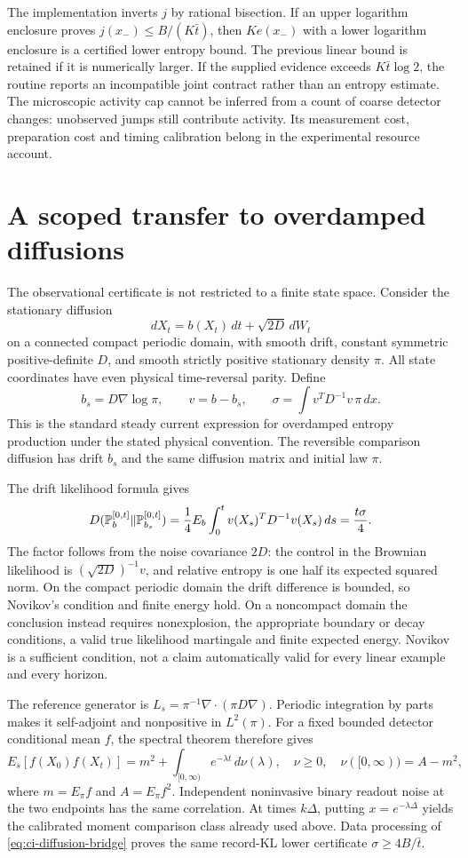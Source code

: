 The implementation inverts $j$ by rational bisection. If an upper logarithm
enclosure proves $j(x_-)\le B/(K\bar t)$, then
$Ke(x_-)$ with a lower logarithm enclosure is a certified lower entropy
bound. The previous linear bound is retained if it is numerically larger.
If the supplied evidence exceeds $K\bar t\log2$, the routine reports an
incompatible joint contract rather than an entropy estimate. The microscopic
activity cap cannot be inferred from a count of coarse detector changes:
unobserved jumps still contribute activity. Its measurement cost, preparation
cost and timing calibration belong in the experimental resource account.

\section{A scoped transfer to overdamped diffusions}
The observational certificate is not restricted to a finite state space.
Consider the stationary diffusion
\[
 dX_t=b(X_t)\,dt+\sqrt{2D}\,dW_t
\]
on a connected compact periodic domain, with smooth drift, constant symmetric
positive-definite $D$, and smooth strictly positive stationary density $\pi$.
All state coordinates have even physical time-reversal parity. Define
\[
 b_s=D\nabla\log\pi,\qquad v=b-b_s,\qquad
 \sigma=\int v^TD^{-1}v\,\pi\,dx.
\]
This is the standard steady current expression for overdamped entropy
production under the stated physical convention\cite{ciSeifert2012}.
The reversible comparison diffusion has drift $b_s$ and the same diffusion
matrix and initial law $\pi$.

The drift likelihood formula\cite{ciGirsanov1960} gives
\begin{equation}
 D(\mathbb P_b^{[0,t]}\Vert\mathbb P_{b_s}^{[0,t]})
   ={1\over4}E_b\int_0^t v(X_s)^TD^{-1}v(X_s)\,ds
   ={t\sigma\over4}.
 \label{eq:ci-diffusion-bridge}
\end{equation}
The factor follows from the noise covariance $2D$: the control in the
Brownian likelihood is $(\sqrt{2D})^{-1}v$, and relative entropy is one half
its expected squared norm. On the compact periodic domain the drift
difference is bounded, so Novikov's condition and finite energy hold.
On a noncompact domain the conclusion instead requires nonexplosion,
the appropriate boundary or decay conditions, a valid true likelihood
martingale and finite expected energy. Novikov is a sufficient condition,
not a claim automatically valid for every linear example and every horizon.

The reference generator is
$L_s=\pi^{-1}\nabla\!\cdot(\pi D\nabla)$.
Periodic integration by parts makes it self-adjoint and nonpositive in
$L^2(\pi)$. For a fixed bounded detector conditional mean $f$, the spectral
theorem therefore gives
\[
 E_s[f(X_0)f(X_t)]
   =m^2+\int_{[0,\infty)} e^{-\lambda t}\,d\nu(\lambda),
 \quad \nu\ge0,\quad\nu([0,\infty))=A-m^2,
\]
where $m=E_\pi f$ and $A=E_\pi f^2$.
Independent noninvasive binary readout noise at the two endpoints has the
same correlation. At times $k\Delta$, putting $x=e^{-\lambda\Delta}$ yields
the calibrated moment comparison class already used above. Data processing
of \eqref{eq:ci-diffusion-bridge} proves the same record-KL lower certificate
$\sigma\ge4B/\bar t$.

